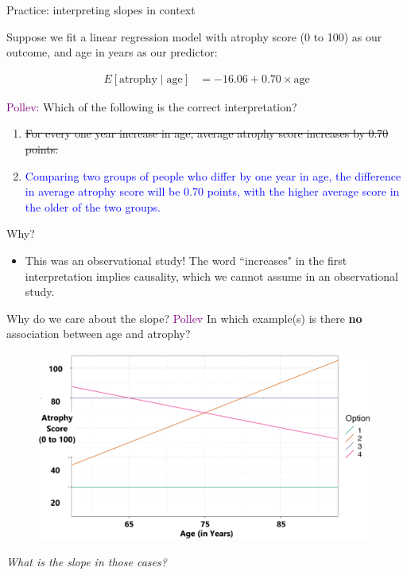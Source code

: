 \documentclass[10pt,t]{beamer}
\begin{document}
\begin{frame}{Practice: interpreting slopes in context}
	
	Suppose we fit a linear regression model with atrophy score (0 to 100) as our outcome, and age in years as our predictor:
	
	\begin{align*}
	E[\text{atrophy} \mid \text{age}] & = -16.06 + 0.70 \times \text{age}
	\end{align*}
	
	
	\textcolor{purple}{Pollev:} Which of the following is the correct interpretation?
	
	\begin{enumerate}
		\item \sout{For every one year increase in age, average atrophy score increases by 0.70 points.}
		\item \textcolor{blue}{Comparing two groups of people who differ by one year in age, the difference in average atrophy score will be 0.70 points, with the higher average score in the older of the two groups.}
	\end{enumerate}\pause

Why?
\begin{itemize}
	\item[] This was an observational study! The word ``increases" in the first interpretation implies causality, which we cannot assume in an observational study.
\end{itemize}

\end{frame}

\begin{frame}{Why do we care about the slope?}
\textcolor{purple}{Pollev} In which example(s) is there \textbf{no} association between age and atrophy?

\vspace{0.3cm}

\begin{figure}
\centering \includegraphics[scale=0.35]{zeroslopes.png}
\end{figure}\pause

\vspace{0.2cm}

\textit{What is the slope in those cases?}

\end{frame}
\end{document}
